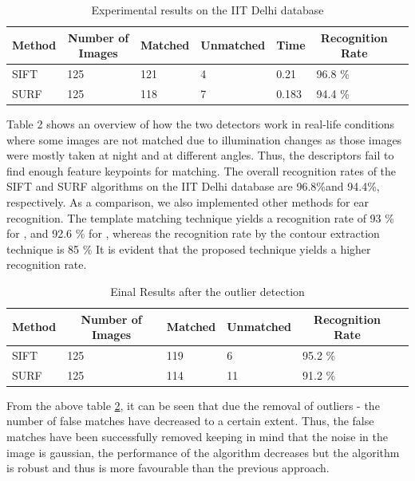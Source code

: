 \begin{table}[]
\centering
\caption{Experimental results on the IIT Delhi database}
\label{table2}
\begin{tabular}{lllllll}
\hline
\multicolumn{1}{c}{Method} &           
\multicolumn{1}{c}{Number of Images} &          
\multicolumn{1}{c}{Matched } &     
\multicolumn{1}{c}{Unmatched } &     
\multicolumn{1}{c}{Time} &     
\multicolumn{1}{c}{Recognition Rate} &     \\ \cline{1-2}
\hline
SIFT  & 125  & 121  & 4 & 0.21 & 96.8 {\%}  \\
\hline
SURF & 125  & 118  & 7 & 0.183 & 94.4 {\%}    \\
 \hline

\end{tabular}
\end{table}

Table 2 shows an overview of how the two detectors work in real-life conditions where some images are not matched due to illumination changes as those images were mostly taken at night and at different angles. Thus, the descriptors fail to find enough feature keypoints for matching. The overall recognition rates of the SIFT and SURF algorithms on the IIT Delhi database are 96.8{\%}and 94.4{\%}, respectively. As a comparison, we also implemented other methods for ear recognition. The template matching technique yields a recognition rate of 93 {\%} for \cite{ansari}, and 92.6 {\%} for \cite{birbhanu}, whereas the recognition rate by the contour extraction technique \cite{bowyer} is 85 {\%} It is evident that the proposed technique yields a higher recognition rate.

\begin{table}[]
\centering
\caption{Einal Results after the outlier detection}
\label{table3}
\begin{tabular}{llllll}
\hline
\multicolumn{1}{c}{Method} &           
\multicolumn{1}{c}{Number of Images} &          
\multicolumn{1}{c}{Matched } &     
\multicolumn{1}{c}{Unmatched } &        
\multicolumn{1}{c}{Recognition Rate} &     \\ \cline{1-2}
\hline
SIFT  & 125  & 119  & 6  & 95.2 {\%}  \\
\hline
SURF & 125  & 114  & 11  & 91.2 {\%}    \\
 \hline

\end{tabular}
\end{table}

From the above table \ref{table3}, it can be seen that due the removal of outliers - the number of false matches have decreased to a certain extent. Thus, the false matches have been successfully removed keeping in mind that the noise in the image is gaussian, the performance of the algorithm decreases but the algorithm is robust and thus is more favourable than the previous approach.

